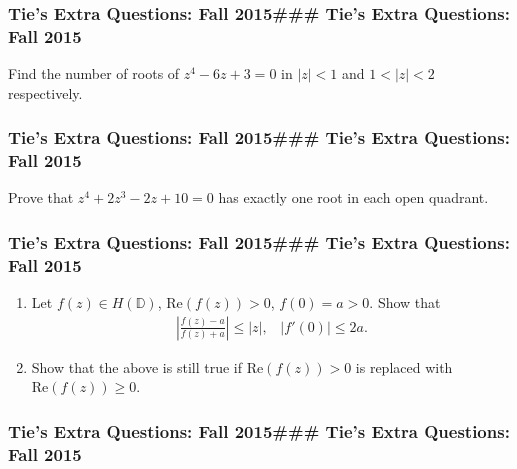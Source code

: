 \hypertarget{ties-extra-questions-fall-2015-ties-extra-questions-fall-2015-10}{%
\subsubsection{Tie's Extra Questions: Fall 2015\#\#\# Tie's Extra
Questions: Fall
2015}\label{ties-extra-questions-fall-2015-ties-extra-questions-fall-2015-10}}

Find the number of roots of \(z^4 - 6z + 3 =0\) in \(|z|<1\) and
\(1 < |z| < 2\) respectively.

\hypertarget{ties-extra-questions-fall-2015-ties-extra-questions-fall-2015-11}{%
\subsubsection{Tie's Extra Questions: Fall 2015\#\#\# Tie's Extra
Questions: Fall
2015}\label{ties-extra-questions-fall-2015-ties-extra-questions-fall-2015-11}}

Prove that \(z^4 + 2 z^3 - 2z + 10 =0\) has exactly one root in each
open quadrant.

\hypertarget{ties-extra-questions-fall-2015-ties-extra-questions-fall-2015-12}{%
\subsubsection{Tie's Extra Questions: Fall 2015\#\#\# Tie's Extra
Questions: Fall
2015}\label{ties-extra-questions-fall-2015-ties-extra-questions-fall-2015-12}}

\begin{enumerate}
\def\labelenumi{(\arabic{enumi})}
\item
  Let \(f(z) \in H({\mathbb D})\), \(\text{Re}(f(z)) >0\),
  \(f(0)= a>0\). Show that
  \begin{align*}|\frac{f(z)-a}{f(z)+a}| \leq |z|, \; \; \;
  |f'(0)| \leq 2a.\end{align*}
\item
  Show that the above is still true if \(\text{Re}(f(z)) >0\) is
  replaced with \(\text{Re}(f(z)) \geq 0\).
\end{enumerate}

\hypertarget{ties-extra-questions-fall-2015-ties-extra-questions-fall-2015-13}{%
\subsubsection{Tie's Extra Questions: Fall 2015\#\#\# Tie's Extra
Questions: Fall
2015}\label{ties-extra-questions-fall-2015-ties-extra-questions-fall-2015-13}}

